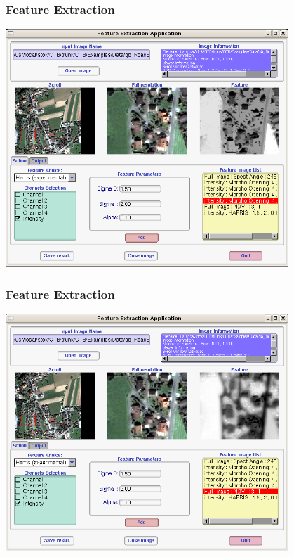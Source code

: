 \documentclass[compress]{beamer}
\begin{document}
\begin{frame}
  \frametitle{Feature Extraction}
      \begin{center}
      \includegraphics[width=0.80\textwidth]{Images/feature5.png}
  \end{center}
\end{frame}


\begin{frame}
  \frametitle{Feature Extraction}
      \begin{center}
      \includegraphics[width=0.80\textwidth]{Images/feature6.png}
  \end{center}
\end{frame}
\end{document}

